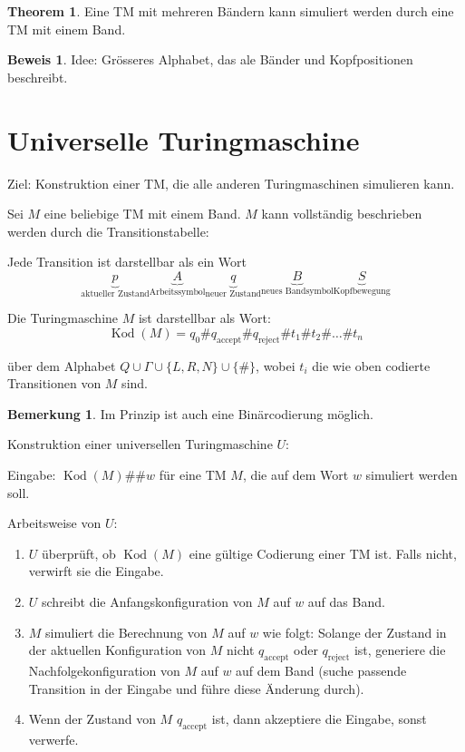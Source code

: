 \documentclass[11pt]{article} %
\theoremstyle{definition}
\newtheorem*{bemerkung}{Bemerkung}
\newtheorem*{beweis}{Beweis}
\newtheorem{theorem}{Theorem}
\begin{document}
\begin{theorem}
Eine TM mit mehreren Bändern kann simuliert werden durch eine TM mit einem Band.
\end{theorem}

\begin{beweis}
Idee: Grösseres Alphabet, das ale Bänder und Kopfpositionen beschreibt.
\end{beweis}

\section{Universelle Turingmaschine}

Ziel: Konstruktion einer TM, die alle anderen Turingmaschinen simulieren kann.

Sei $M$ eine beliebige TM mit einem Band. $M$ kann vollständig beschrieben werden durch die Transitionstabelle:

Jede Transition ist darstellbar als ein Wort
\[
\underbrace{p}_{\textrm{aktueller Zustand}}
\underbrace{A}_{\textrm{Arbeitssymbol}}
\underbrace{q}_{\textrm{neuer Zustand}}
\underbrace{B}_{\textrm{neues Bandsymbol}}
\underbrace{S}_{\textrm{Kopfbewegung}}
\]

Die Turingmaschine $M$ ist darstellbar als Wort:
\[
\operatorname{Kod}(M) = q_0\textrm{\#}q_\textrm{accept}\textrm{\#}q_\textrm{reject}\#t_1\#t_2\#\dots\#t_n
\]

über dem Alphabet $Q \cup \Gamma \cup \{L,R,N\}\cup \{\#\}$, wobei $t_i$ die wie oben codierte Transitionen von $M$ sind.

\begin{bemerkung}
Im Prinzip ist auch eine Binärcodierung möglich.
\end{bemerkung}

Konstruktion einer universellen Turingmaschine $U$:

Eingabe: $\operatorname{Kod}(M)\#\#w$ für eine TM $M$, die auf dem Wort $w$ simuliert werden soll.

Arbeitsweise von $U$:
\begin{enumerate}
\item $U$ überprüft, ob $\operatorname{Kod}(M)$ eine gültige Codierung einer TM ist. Falls nicht, verwirft sie die Eingabe.
\item $U$ schreibt die Anfangskonfiguration von $M$ auf $w$ auf das Band.
\item $M$ simuliert die Berechnung von $M$ auf $w$ wie folgt:
Solange der Zustand in der aktuellen Konfiguration von $M$ nicht $q_\textrm{accept}$ oder $q_\textrm{reject}$ ist, generiere die Nachfolgekonfiguration von $M$ auf $w$ auf dem Band (suche passende Transition in der Eingabe und führe diese Änderung durch).
\item Wenn der Zustand von $M$ $q_\textrm{accept}$ ist, dann akzeptiere die Eingabe, sonst verwerfe.
\end{enumerate}
\end{document}
